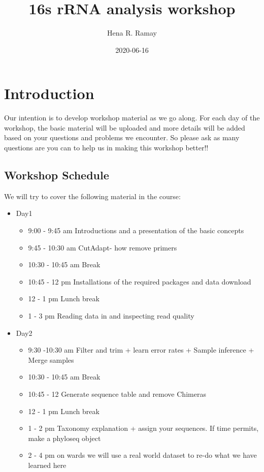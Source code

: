\documentclass[
]{book}
\title{16s rRNA analysis workshop}
\author{Hena R. Ramay}
\date{2020-06-16}
\providecommand{\tightlist}{%
  \setlength{\itemsep}{0pt}\setlength{\parskip}{0pt}}
\begin{document}
\maketitle

{
\setcounter{tocdepth}{1}
\tableofcontents
}
\hypertarget{introduction}{%
\chapter{Introduction}\label{introduction}}

Our intention is to develop workshop material as we go along. For each day of the workshop, the basic material will be uploaded and more details will be added based on your questions and problems we encounter. So please ask as many questions are you can to help us in making this workshop better!!

\hypertarget{workshop-schedule}{%
\section{Workshop Schedule}\label{workshop-schedule}}

We will try to cover the following material in the course:

\begin{itemize}
\tightlist
\item
  Day1

  \begin{itemize}
  \tightlist
  \item
    9:00 - 9:45 am Introductions and a presentation of the basic concepts
  \item
    9:45 - 10:30 am CutAdapt- how remove primers
  \item
    10:30 - 10:45 am Break
  \item
    10:45 - 12 pm Installations of the required packages and data download
  \item
    12 - 1 pm Lunch break
  \item
    1 - 3 pm Reading data in and inspecting read quality
  \end{itemize}
\item
  Day2

  \begin{itemize}
  \tightlist
  \item
    9:30 -10:30 am Filter and trim + learn error rates + Sample inference + Merge samples
  \item
    10:30 - 10:45 am Break
  \item
    10:45 - 12 Generate sequence table and remove Chimeras
  \item
    12 - 1 pm Lunch break
  \item
    1 - 2 pm Taxonomy explanation + assign your sequences. If time permits, make a phyloseq object
  \item
    2 - 4 pm on wards we will use a real world dataset to re-do what we have learned here
  \end{itemize}
\end{itemize}
\end{document}
